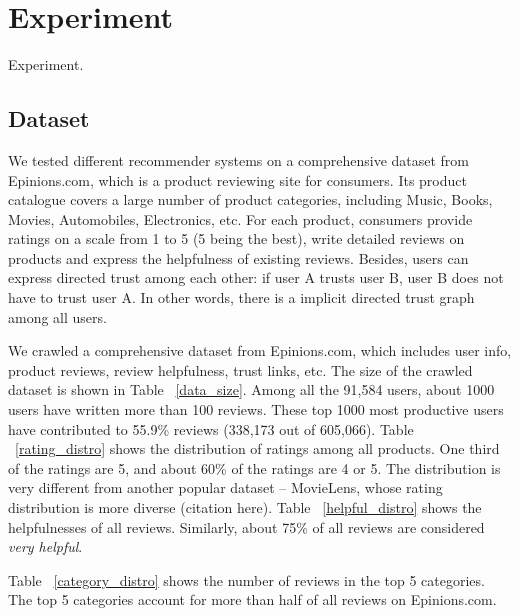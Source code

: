 \documentclass[12pt]{article}
\begin{document}



\section{Experiment}
Experiment.
\subsection{Dataset}
We tested different recommender systems on a comprehensive dataset from Epinions.com, which is a product reviewing site for consumers. Its product catalogue covers a large number of product categories, including Music, Books, Movies, Automobiles, Electronics, etc. For each product, consumers provide ratings on a scale from 1 to 5 (5 being the best), write detailed reviews on products and express the helpfulness of existing reviews. Besides, users can express directed trust among each other: if user A trusts user B, user B does not have to trust user A. In other words, there is a implicit directed trust graph among all users. 

We crawled a comprehensive dataset from Epinions.com, which includes user info, product reviews, review helpfulness, trust links, etc. The size of the crawled dataset is shown in Table ~\ref{data_size}. Among all the 91,584 users, about 1000 users have written more than 100 reviews. These top 1000 most productive users have contributed to 55.9\% reviews (338,173 out of 605,066).  Table ~\ref{rating_distro} shows the distribution of ratings among all products. One third of the ratings are 5, and about 60\% of the ratings are 4 or 5. The distribution is very different from another popular dataset -- MovieLens, whose rating distribution is more diverse (citation here). Table ~\ref{helpful_distro} shows the helpfulnesses of all reviews. Similarly, about 75\% of all reviews are considered \emph{very helpful}. 

Table ~\ref{category_distro} shows the number of reviews in the top 5 categories. The top 5 categories account for more than half of all reviews on Epinions.com.
\end{document}
